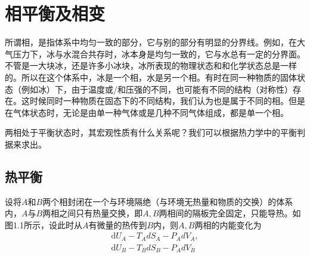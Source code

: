 ﻿\section{相平衡及相变}
所谓相，是指体系中均匀一致的部分，它与别的部分有明显的分界线。例如，在大气压力下，冰与水混合共存时，冰本身是均匀一致的，它与水总有一定的分界面。不管是一大块冰，还是许多小冰块，冰所表现的物理状态和和化学状态总是一样的。所以在这个体系中，冰是一个相，水是另一个相。有时在同一种物质的固体状态（例如冰）下，由于温度或/和压强的不同，也可能有不同的结构（对称性）存在。这时候同时一种物质在固态下的不同结构，我们认为也是属于不同的相。但是在气体状态时，无论是由单一种气体或是几种不同气体组成，都是单一个相。

两相处于平衡状态时，其宏观性质有什么关系呢？我们可以根据热力学中的平衡判据来求出。

\subsection{热平衡}
设将$A$和$B$两个相封闭在一个与环境隔绝（与环境无热量和物质的交换）的体系内，$A$与$B$两相之间只有热量交换，即$A,B$两相间的隔板完全固定，只能导热。如图1.1所示，设此时从$A$有微量的热传到$B$内，则$A,B$两相的内能变化为
\begin{equation}
\begin{aligned}
\mathrm{d}U_A-T_AdS_A-P_AdV_A, \\
\mathrm{d}U_B-T_BdS_B-P_AdV_B
\end{aligned}
\end{equation}